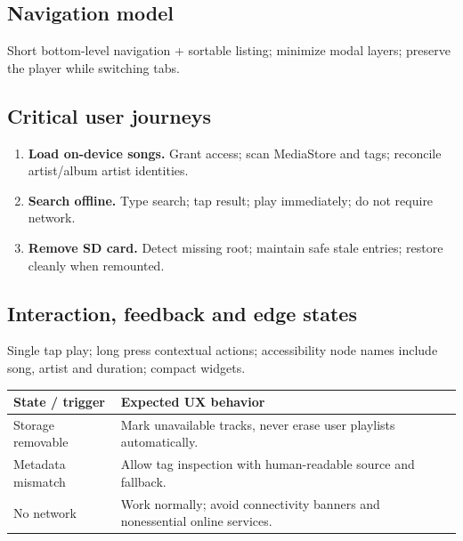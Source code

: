 \documentclass[10pt,a4paper,oneside]{report}
\begin{document}
\subsection*{Navigation model}
Short bottom-level navigation + sortable listing; minimize modal layers; preserve the player while switching tabs.\par
\subsection*{Critical user journeys}
\begin{enumerate}[leftmargin=*,itemsep=3pt,topsep=2pt]
\item \textbf{Load on-device songs.} Grant access; scan MediaStore and tags; reconcile artist/album artist identities.
\item \textbf{Search offline.} Type search; tap result; play immediately; do not require network.
\item \textbf{Remove SD card.} Detect missing root; maintain safe stale entries; restore cleanly when remounted.
\end{enumerate}
\subsection*{Interaction, feedback and edge states}
Single tap play; long press contextual actions; accessibility node names include song, artist and duration; compact widgets.\par
\begin{tabularx}{\linewidth}{@{}p{39mm}X@{}}\toprule State / trigger & Expected UX behavior\\\midrule
Storage removable & Mark unavailable tracks, never erase user playlists automatically.\\
Metadata mismatch & Allow tag inspection with human-readable source and fallback.\\
No network & Work normally; avoid connectivity banners and nonessential online services.\\
\bottomrule\end{tabularx}
\end{document}
